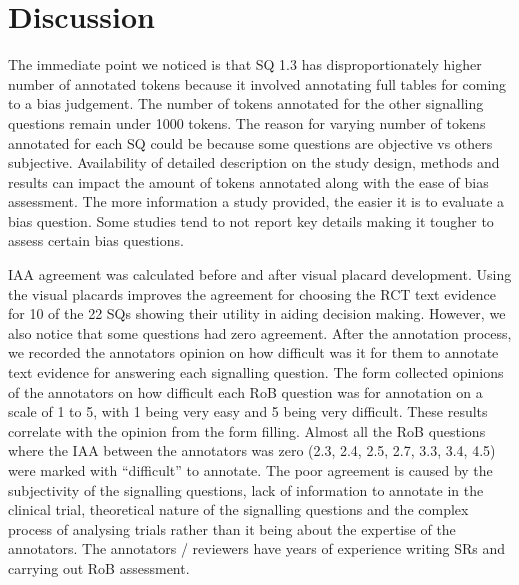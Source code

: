 \documentclass[sn-mathphys,Numbered]{sn-jnl}%
\theoremstyle{thmstyleone}%
\theoremstyle{thmstyletwo}%
\theoremstyle{thmstylethree}%
\begin{document}
\section{Discussion}
\label{sec:discussion}
%
%
%
The immediate point we noticed is that SQ 1.3 has disproportionately higher number of annotated tokens because it involved annotating full tables for coming to a bias judgement.
The number of tokens annotated for the other signalling questions remain under 1000 tokens.
The reason for varying number of tokens annotated for each SQ could be because some questions are objective vs others subjective.
Availability of detailed description on the study design, methods and results can impact the amount of tokens annotated along with the ease of bias assessment.
The more information a study provided, the easier it is to evaluate a bias question.
Some studies tend to not report key details making it tougher to assess certain bias questions.


IAA agreement was calculated before and after visual placard development.
Using the visual placards improves the agreement for choosing the RCT text evidence for 10 of the 22 SQs showing their utility in aiding decision making.
However, we also notice that some questions had zero agreement.
After the annotation process, we recorded the annotators opinion on how difficult was it for them to annotate text evidence for answering each signalling question.
The form collected opinions of the annotators on how difficult each RoB question was for annotation on a scale of 1 to 5, with 1 being very easy and 5 being very difficult.
These results correlate with the opinion from the form filling.
Almost all the RoB questions where the IAA between the annotators was zero (2.3, 2.4, 2.5, 2.7, 3.3, 3.4, 4.5) were marked with ``difficult'' to annotate.
The poor agreement is caused by the subjectivity of the signalling questions, lack of information to annotate in the clinical trial, theoretical nature of the signalling questions and the complex process of analysing trials rather than it being about the expertise of the annotators.
The annotators / reviewers have years of experience writing SRs and carrying out RoB assessment.
\end{document}
